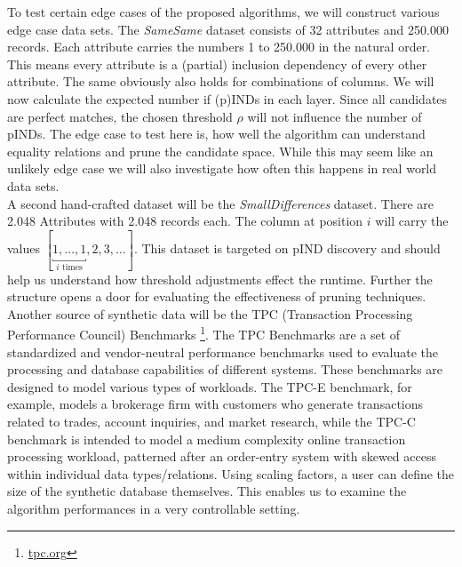 \noindent To test certain edge cases of the proposed algorithms, we will construct various edge case data sets. The \textit{SameSame} dataset consists of 32 attributes and 250.000 records. Each attribute carries the numbers 1 to 250.000 in the natural order. This means every attribute is a (partial) inclusion dependency of every other attribute. The same obviously also holds for combinations of columns. We will now calculate the expected number if (p)INDs in each layer. Since all candidates are perfect matches, the chosen threshold $\rho$ will not influence the number of pINDs. The edge case to test here is, how well the algorithm can understand equality relations and prune the candidate space. While this may seem like an unlikely edge case we will also investigate how often this happens in real world data sets. \\

\noindent A second hand-crafted dataset will be the \textit{SmallDifferences} dataset. There are 2.048 Attributes with 2.048 records each. The column at position $i$ will carry the values $[\underbracket{1, \dots, 1}_{i\text{ times}}, 2, 3, \dots]$. This dataset is targeted on pIND discovery and should help us understand how threshold adjustments effect the runtime. Further the structure opens a door for evaluating the effectiveness of pruning techniques.\\

\noindent Another source of synthetic data will be the TPC (Transaction Processing Performance Council) Benchmarks \footnote{\href{https://www.tpc.org/}{tpc.org}}. The TPC Benchmarks are a set of standardized and vendor-neutral performance benchmarks used to evaluate the processing and database capabilities of different systems. These benchmarks are designed to model various types of workloads. The TPC-E benchmark, for example, models a brokerage firm with customers who generate transactions related to trades, account inquiries, and market research, while the TPC-C benchmark is intended to model a medium complexity online transaction processing workload, patterned after an order-entry system with skewed access within individual data types/relations. Using scaling factors, a user can define the size of the synthetic database themselves. This enables us to examine the algorithm performances in a very controllable setting.

